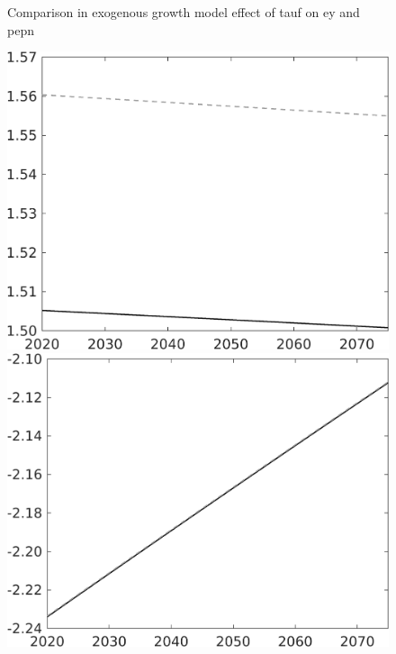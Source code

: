 \documentclass[12pt]{article}
\begin{document}
\begin{figure}{Comparison in exogenous growth model effect of tauf on ey and pepn }
\begin{minipage}[]{0.32\textwidth}
		\end{minipage}
	\begin{minipage}[]{0.32\textwidth}
		\includegraphics[width=1\textwidth]{../../codding_model/own_basedOnFried/optimalPol_010922_revision/figures/all_13Sept22/LevTaufNoTauf_TaulCalib_regime0_pn_spillover0_nsk0_xgr1_knspil1_sep0_LFlimit0_emsbase0_countec0_GovRev0_etaa0.79_lgd0.png}
	\end{minipage}
		\begin{minipage}[]{0.32\textwidth}
			\includegraphics[width=1\textwidth]{../../codding_model/own_basedOnFried/optimalPol_010922_revision/figures/all_13Sept22/PerdifNoTauf_regime0_CompTaul_EY_spillover0_nsk0_xgr1_knspil1_sep0_LFlimit0_emsbase0_countec0_GovRev0_etaa0.79_lgd0.png}

\end{minipage}
\end{figure}
\end{document}
